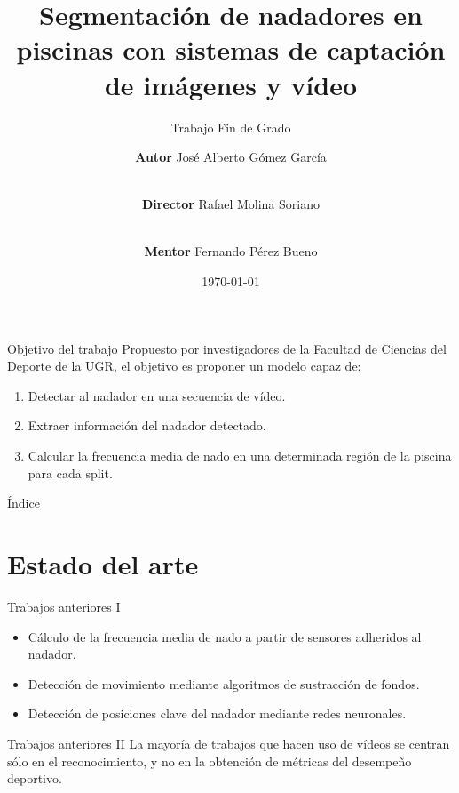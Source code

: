 \documentclass[11pt]{beamer}
\title{Segmentación de nadadores en piscinas con sistemas de captación de imágenes y vídeo}
\subtitle{Trabajo Fin de Grado}
\author[José Alberto Gómez García]{\textbf{Autor} José Alberto Gómez García
\and
     \\ \textbf{Director} Rafael Molina Soriano
\and
     \\ \textbf{Mentor} Fernando Pérez Bueno \\
     }
\date{\today}
\institute{
    Escuela Técnica Superior de Ingenierías Informática y de Telecomunicación \\
    Universidad de Granada
}
\begin{document}
    \maketitle
    
    \begin{frame}{Objetivo del trabajo}
        Propuesto por investigadores de la Facultad de Ciencias del Deporte de la UGR, el objetivo es proponer un modelo capaz de:
        \begin{enumerate}
            \item Detectar al nadador en una secuencia de vídeo.
            \item Extraer información del nadador detectado.
            \item Calcular la frecuencia media de nado en una determinada región de la piscina para cada split.
        \end{enumerate}
    \end{frame}
    
    \begin{frame}{Índice}
        \setcounter{tocdepth}{2}
        \setcounter{secnumdepth}{2}
        \tableofcontents
    \end{frame}
    
    \section{Estado del arte}
    \begin{frame}{Trabajos anteriores I}
        \begin{itemize}
            \item Cálculo de la frecuencia media de nado a partir de sensores adheridos al nadador.
            \item Detección de movimiento mediante algoritmos de sustracción de fondos.
            \item Detección de posiciones clave del nadador mediante redes neuronales. 
        \end{itemize}
    \end{frame}
    
    \begin{frame}{Trabajos anteriores II}
         La mayoría de trabajos que hacen uso de vídeos se centran sólo en el reconocimiento, y no en la obtención de métricas del desempeño deportivo.
    \end{frame}
    
\end{document}
